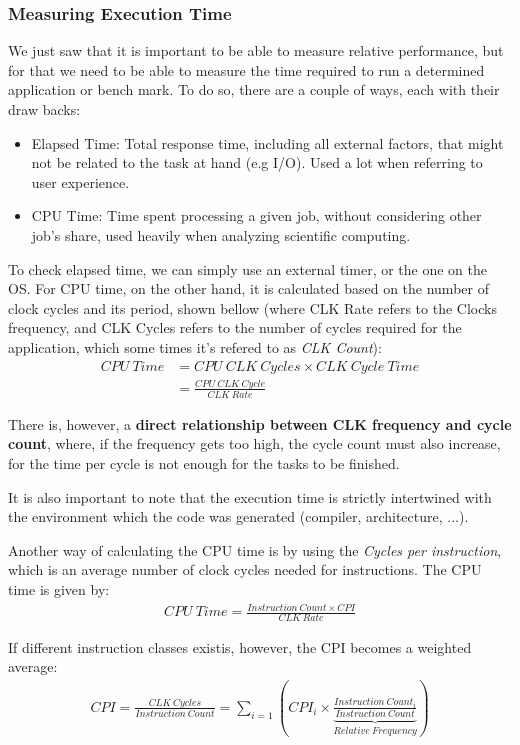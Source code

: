 \documentclass{article}
\begin{document}
\subsubsection{Measuring Execution Time}
We just saw that it is important to be able to measure relative performance, but for that we need to be able to measure the time required to run a determined application or bench mark. To do so, there are a couple of ways, each with their draw backs:
\begin{itemize}
    \item Elapsed Time: Total response time, including all external factors, that might not be related to the task at hand (e.g I/O). Used a lot when referring to user experience.
    \item CPU Time: Time spent processing a given job, without considering other job's share, used heavily when analyzing scientific computing.
\end{itemize}

To check elapsed time, we can simply use an external timer, or the one on the OS. For CPU time, on the other hand, it is calculated based on the number of clock cycles and its period, shown bellow (where CLK Rate refers to the Clocks frequency, and CLK Cycles refers to the number of cycles required for the application, which some times it's refered to as \emph{CLK Count}):
\begin{align}
    CPU \ Time &= CPU \ CLK\ Cycles \times CLK \ Cycle \ Time \\
               &= \frac{CPU\ CLK\ Cycle}{CLK\ Rate}
\end{align}

There is, however, a \textbf{direct relationship between CLK frequency and cycle count}, where, if the frequency gets too high, the cycle count must also increase, for the time per cycle is not enough for the tasks to be finished.

It is also important to note that the execution time is strictly intertwined with the environment which the code was generated (compiler, architecture, ...).

Another way of calculating the CPU time is by using the \emph{Cycles per instruction}, which is an average number of clock cycles needed for instructions. The CPU time is given by:
\begin{align}
    CPU\ Time = \frac{Instruction\ Count \times CPI}{CLK \ Rate}
\end{align}

If different instruction classes existis, however, the CPI becomes a weighted average:
\begin{align}
    CPI = \frac{CLK \ Cycles}{Instruction \ Count} = \sum_{i = 1} \left(CPI_i \times \underbrace{\frac{Instruction\ Count_i}{Instruction\ Count}}_{Relative\ Frequency}\right)
\end{align}
\end{document}
